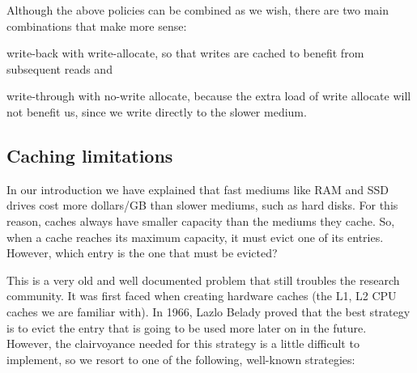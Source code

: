 Although the above policies can be combined as we wish, there are two main 
combinations that make more sense:
\begin{inparaenum}[i)]
\item write-back with write-allocate, so that writes are cached to benefit from 
	subsequent reads and
\item write-through with no-write allocate, because the extra load of write 
	allocate will not benefit us, since we write directly to the slower 
	medium.
\end{inparaenum}

\subsection{Caching limitations}

In our introduction we have explained that fast mediums like RAM and SSD drives 
cost more dollars/GB than slower mediums, such as hard disks.  For this reason, 
caches always have smaller capacity than the mediums they cache.  So, when a 
cache reaches its maximum capacity, it must evict one of its entries.  However, 
which entry is the one that must be evicted?

This is a very old and well documented problem that still troubles the research 
community. It was first faced when creating hardware caches (the L1, L2 CPU 
caches we are familiar with). In 1966, Lazlo Belady proved that the best 
strategy is to evict the entry that is going to be used more later on in the 
future\cite{Belady}.  However, the clairvoyance needed for this strategy is a 
little difficult to implement, so we resort to one of the following, well-known 
strategies:

